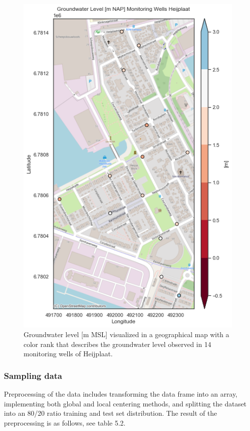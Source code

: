 \begin{figure}[htbp]
    \centering
    \includegraphics[width=0.60\linewidth]{gwlheij.png}
    \caption{Groundwater level [m MSL] visualized in a geographical map with a color rank that describes the groundwater level observed in 14 monitoring wells of Heijplaat.}   
\end{figure}

\clearpage

\subsubsection{Sampling data}
Preprocessing of the data includes transforming the data frame into an array, implementing both global and local centering methods, and splitting the dataset into an 80/20 ratio training and test set distribution. The result of the preprocessing is as follows, see table 5.2.

